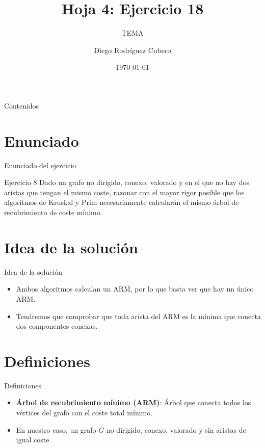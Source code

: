 \documentclass[aspectratio=169]{beamer}
\title{Hoja 4: Ejercicio 18}
\subtitle{TEMA}
\author{Diego Rodríguez Cubero}
\institute{UCM}
\date{\today}
\begin{document}
\begin{frame}
    \titlepage
\end{frame}

\begin{frame}{Contenidos}
    \tableofcontents
\end{frame}

\section{Enunciado}
\begin{frame}{Enunciado del ejercicio}
    \begin{block}{Ejercicio 8}
        Dado un grafo no dirigido, conexo, valorado y en el que no hay dos aristas que tengan el    mismo coste, razonar con el mayor rigor posible que los algoritmos de Kruskal y Prim
        necesariamente calcularán el mismo árbol de recubrimiento de coste mínimo.
    \end{block}
\end{frame}

\section{Idea de la solución}
\begin{frame}{Idea de la solución}
    \begin{itemize}
        \item Ambos algoritmos calculan un ARM, por lo que basta ver que hay un único ARM.
        \item Tendremos que comprobar que toda arista del ARM es la mínima que conecta dos componentes conexas.
    \end{itemize}
\end{frame}

\section{Definiciones}
\begin{frame}{Definiciones}
    \begin{itemize}
        \item \textbf{Árbol de recubrimiento mínimo (ARM)}: Árbol que conecta todos los vértices del grafo con el coste total mínimo.
        \item En nuestro caso, un grafo $G$ no dirigido, conexo, valorado y sin aristas de igual coste.
    \end{itemize}
\end{frame}
\end{document}
